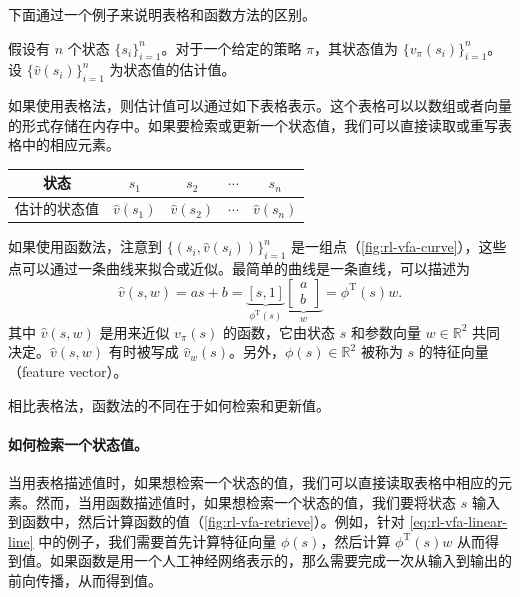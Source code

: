 下面通过一个例子来说明表格和函数方法的区别。

假设有 $n$ 个状态 $\{s_i\}_{i=1}^n$。对于一个给定的策略 $\pi$，其状态值为 $\{v_\pi(s_i)\}_{i=1}^n$。设 $\{\hat{v}(s_i)\}_{i=1}^n$ 为状态值的估计值。

如果使用表格法，则估计值可以通过如下表格表示。这个表格可以以数组或者向量的形式存储在内存中。如果要检索或更新一个状态值，我们可以直接读取或重写表格中的相应元素。

\begin{table}[H]\centering
\begin{tabular}{ccccc}
\toprule
状态 & $s_1$ & $s_2$ & $\cdots$ & $s_n$ \\
\midrule
估计的状态值 & $\hat{v}(s_1)$ & $\hat{v}(s_2)$ & $\cdots$ & $\hat{v}(s_n)$ \\
\bottomrule
\end{tabular}
\end{table}

如果使用函数法，注意到 $\{(s_i, \hat{v}(s_i))\}_{i=1}^n$ 是一组点（\cref{fig:rl-vfa-curve}），这些点可以通过一条曲线来拟合或近似。最简单的曲线是一条直线，可以描述为
\begin{equation}
\hat{v}(s, w) = a s + b = \underbrace{[s, 1]}_{\phi^{\mathrm{T}}(s)} \underbrace{\left[\begin{array}{l} a \\ b \end{array}\right]}_{w} = \phi^{\mathrm{T}}(s) w.
\label{eq:rl-vfa-linear-line}
\end{equation}
其中 $\hat{v}(s,w)$ 是用来近似 $v_{\pi}(s)$ 的函数，它由状态 $s$ 和参数向量 $w\in \mathbb{R}^2$ 共同决定。$\hat{v}(s,w)$ 有时被写成 $\hat{v}_w(s)$。另外，$\phi(s) \in \mathbb{R}^2$ 被称为 $s$ 的特征向量（feature vector）。

相比表格法，函数法的不同在于如何检索和更新值。

\paragraph{如何检索一个状态值。}当用表格描述值时，如果想检索一个状态的值，我们可以直接读取表格中相应的元素。然而，当用函数描述值时，如果想检索一个状态的值，我们要将状态 $s$ 输入到函数中，然后计算函数的值（\cref{fig:rl-vfa-retrieve}）。例如，针对 \cref{eq:rl-vfa-linear-line} 中的例子，我们需要首先计算特征向量 $\phi(s)$，然后计算 $\phi^{\mathrm{T}}(s)w$ 从而得到值。如果函数是用一个人工神经网络表示的，那么需要完成一次从输入到输出的前向传播，从而得到值。

